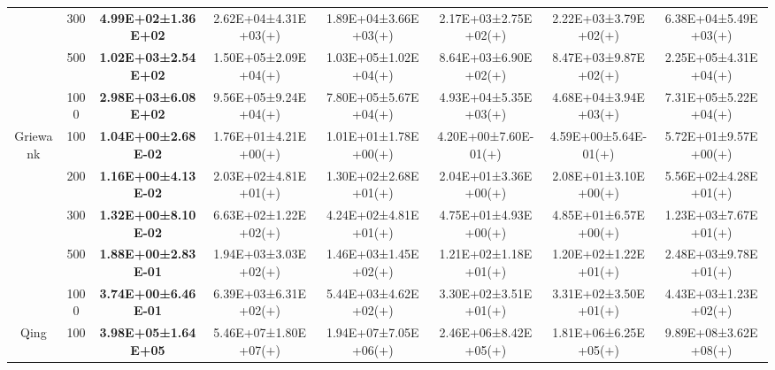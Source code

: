\begin{tabular}{|cc|c|c|c|c|c|c|}
\multicolumn{1}{|c|}{}                            & 300       & \textbf{4.99E+02±1.36E+02} & 2.62E+04±4.31E+03($+$) & 1.89E+04±3.66E+03($+$)       & 2.17E+03±2.75E+02($+$)       & 2.22E+03±3.79E+02($+$)                & 6.38E+04±5.49E+03($+$) \\ \cline{2-8} 
\multicolumn{1}{|c|}{}                            & 500       & \textbf{1.02E+03±2.54E+02} & 1.50E+05±2.09E+04($+$) & 1.03E+05±1.02E+04($+$)       & 8.64E+03±6.90E+02($+$)       & 8.47E+03±9.87E+02($+$)                & 2.25E+05±4.31E+04($+$) \\ \cline{2-8} 
\multicolumn{1}{|c|}{}                            & 1000      & \textbf{2.98E+03±6.08E+02} & 9.56E+05±9.24E+04($+$) & 7.80E+05±5.67E+04($+$)       & 4.93E+04±5.35E+03($+$)       & 4.68E+04±3.94E+03($+$)                & 7.31E+05±5.22E+04($+$) \\ \hline
\multicolumn{1}{|c|}{\multirow{5}{*}{Griewank}}   & 100       & \textbf{1.04E+00±2.68E-02} & 1.76E+01±4.21E+00($+$) & 1.01E+01±1.78E+00($+$)       & 4.20E+00±7.60E-01($+$)       & 4.59E+00±5.64E-01($+$)                & 5.72E+01±9.57E+00($+$) \\ \cline{2-8} 
\multicolumn{1}{|c|}{}                            & 200       & \textbf{1.16E+00±4.13E-02} & 2.03E+02±4.81E+01($+$) & 1.30E+02±2.68E+01($+$)       & 2.04E+01±3.36E+00($+$)       & 2.08E+01±3.10E+00($+$)                & 5.56E+02±4.28E+01($+$) \\ \cline{2-8} 
\multicolumn{1}{|c|}{}                            & 300       & \textbf{1.32E+00±8.10E-02} & 6.63E+02±1.22E+02($+$) & 4.24E+02±4.81E+01($+$)       & 4.75E+01±4.93E+00($+$)       & 4.85E+01±6.57E+00($+$)                & 1.23E+03±7.67E+01($+$) \\ \cline{2-8} 
\multicolumn{1}{|c|}{}                            & 500       & \textbf{1.88E+00±2.83E-01} & 1.94E+03±3.03E+02($+$) & 1.46E+03±1.45E+02($+$)       & 1.21E+02±1.18E+01($+$)       & 1.20E+02±1.22E+01($+$)                & 2.48E+03±9.78E+01($+$) \\ \cline{2-8} 
\multicolumn{1}{|c|}{}                            & 1000      & \textbf{3.74E+00±6.46E-01} & 6.39E+03±6.31E+02($+$) & 5.44E+03±4.62E+02($+$)       & 3.30E+02±3.51E+01($+$)       & 3.31E+02±3.50E+01($+$)                & 4.43E+03±1.23E+02($+$) \\ \hline
\multicolumn{1}{|c|}{\multirow{5}{*}{Qing}}       & 100       & \textbf{3.98E+05±1.64E+05} & 5.46E+07±1.80E+07($+$) & 1.94E+07±7.05E+06($+$)       & 2.46E+06±8.42E+05($+$)       & 1.81E+06±6.25E+05($+$)                & 9.89E+08±3.62E+08($+$) \\ \cline{2-8} 

\end{tabular}
